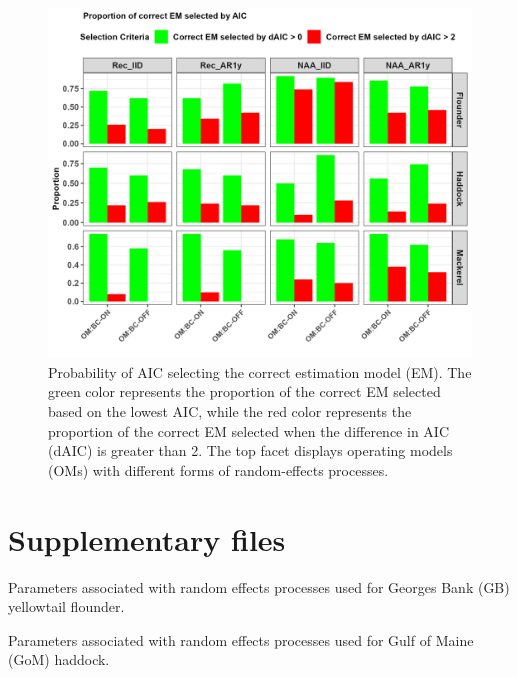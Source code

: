 \documentclass[
  12pt,
]{article}
\begin{document}
\begin{figure}[H]
\centering
\includegraphics[width=\textwidth]{Original_Figures&Tables/AIC_select.PNG}
\caption{Probability of AIC selecting the correct estimation model (EM). The green color represents the proportion of the correct EM selected based on the lowest AIC, while the red color represents the proportion of the correct EM selected when the difference in AIC (dAIC) is greater than 2. The top facet displays operating models (OMs) with different forms of random-effects processes.}
\label{fig:AIC_select}
\end{figure}

\section{Supplementary files}\label{supplementary-files}

\renewcommand{\thetable}{S\arabic{table}}
\setcounter{table}{0}

\begin{table}[H]
    \centering
    \caption{Parameters associated with random effects processes used for Georges Bank (GB) yellowtail flounder.}
    \label{supp_flounder_table}
    
\end{table}

\begin{table}[H]
    \centering
    \caption{Parameters associated with random effects processes used for Gulf of Maine (GoM) haddock.}
    \label{supp_haddock_table}
    
\end{table}
\end{document}
